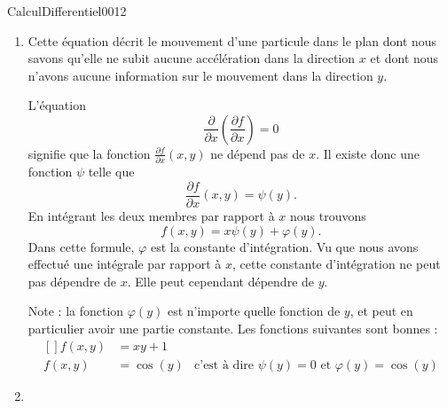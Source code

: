\begin{corrige}{CalculDifferentiel0012}

	\begin{enumerate}
		\item
			Cette équation décrit le mouvement d'une particule dans le plan dont nous savons qu'elle ne subit aucune accélération dans la direction $x$ et dont nous n'avons aucune information sur le mouvement dans la direction $y$.

			L'équation
			\begin{equation}
				\frac{ \partial  }{ \partial x }\left( \frac{ \partial f }{ \partial x } \right)=0
			\end{equation}
			signifie que la fonction $\frac{ \partial f }{ \partial x }(x,y)$ ne dépend pas de $x$. Il existe donc une fonction $\psi$ telle que 
			\begin{equation}
				\frac{ \partial f }{ \partial x }(x,y)=\psi(y).
			\end{equation}
			En intégrant les deux membres par rapport à $x$ nous trouvons
			\begin{equation}
				f(x,y)=x\psi(y)+\varphi(y).
			\end{equation}
			Dans cette formule, $\varphi$ est la constante d'intégration. Vu que nous avons effectué une intégrale par rapport à $x$, cette constante d'intégration ne peut pas dépendre de $x$. Elle peut cependant dépendre de $y$.

			Note : la fonction $\varphi(y)$ est n'importe quelle fonction  de $y$, et peut en particulier avoir une partie constante. Les fonctions suivantes sont bonnes :
			\begin{equation}
				\begin{aligned}[]
					f(x,y)&=xy+1\\
                    f(x,y)&=\cos(y)	&\text{c'est à  dire }\psi(y)=0 \text{ et } \varphi(y)=\cos(y)
				\end{aligned}
			\end{equation}
		
		\item


\end{enumerate}
\end{corrige}
